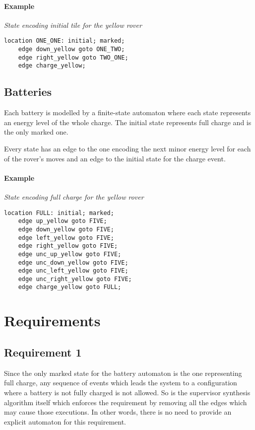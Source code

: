 \documentclass{article}
\begin{document}
\paragraph{Example}
\textit{State encoding initial tile for the yellow rover}
\begin{verbatim}
location ONE_ONE: initial; marked;
    edge down_yellow goto ONE_TWO;
    edge right_yellow goto TWO_ONE;
    edge charge_yellow;
\end{verbatim}

\newpage

\subsection{Batteries}
Each battery is modelled by a finite-state automaton
where each state represents an energy level of the whole charge.
The initial state represents full charge and is the only marked one.

Every state has an edge to the one encoding the next minor energy level
for each of the rover's moves
and an edge to the initial state for the charge event.

\paragraph{Example}
\textit{State encoding full charge for the yellow rover}
\begin{verbatim}
location FULL: initial; marked;
    edge up_yellow goto FIVE;
    edge down_yellow goto FIVE;
    edge left_yellow goto FIVE;
    edge right_yellow goto FIVE;
    edge unc_up_yellow goto FIVE;
    edge unc_down_yellow goto FIVE;
    edge unc_left_yellow goto FIVE;
    edge unc_right_yellow goto FIVE;
    edge charge_yellow goto FULL;
\end{verbatim}

\section{Requirements}

\subsection{Requirement 1}
Since the only marked state for the battery automaton
is the one representing full charge,
any sequence of events which leads the system to a configuration
where a battery is not fully charged is not allowed.
So is the supervisor synthesis algorithm itself which enforces the
requirement by removing all the edges which may cause those executions.
In other words, there is no need to provide an explicit automaton for this requirement.
\end{document}
